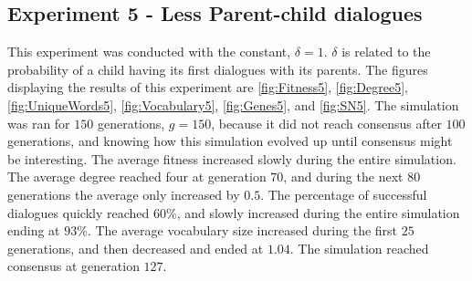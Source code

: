 \subsection{Experiment 5 - Less Parent-child dialogues}
This experiment was conducted with the constant, $\delta = 1$. $\delta$ is related to the probability of a child having its first dialogues with its parents. The figures displaying the results of this experiment are \ref{fig:Fitness5}, \ref{fig:Degree5}, \ref{fig:UniqueWords5}, \ref{fig:Vocabulary5}, \ref{fig:Genes5}, and \ref{fig:SN5}. The simulation was ran for $150$ generations, $g = 150$, because it did not reach consensus after $100$ generations, and knowing how this simulation evolved up until consensus might be interesting. The average fitness increased slowly during the entire simulation. The average degree reached four at generation $70$, and during the next $80$ generations the average only increased by $0.5$. The percentage of successful dialogues quickly reached $60\%$, and slowly increased during the entire simulation ending at $93\%$. The average vocabulary size increased during the first $25$ generations, and then decreased and ended at $1.04$. The simulation reached consensus at generation $127$.

